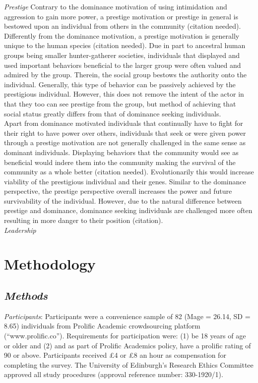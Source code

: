 \documentclass[
  english,
  a4paper]{apa7}
\begin{document}
\emph{Prestige}
Contrary to the dominance motivation of using intimidation and aggression to gain more power, a prestige motivation or prestige in general is bestowed upon an individual from others in the community (citation needed). Differently from the dominance motivation, a prestige motivation is generally unique to the human species (citation needed). Due in part to ancestral human groups being smaller hunter-gatherer societies, individuals that displayed and used important behaviors beneficial to the larger group were often valued and admired by the group. Therein, the social group bestows the authority onto the individual. Generally, this type of behavior can be passively achieved by the prestigious individual. However, this does not remove the intent of the actor in that they too can see prestige from the group, but method of achieving that social status greatly differs from that of dominance seeking individuals.\\
Apart from dominance motivated individuals that continually have to fight for their right to have power over others, individuals that seek or were given power through a prestige motivation are not generally challenged in the same sense as dominant individuals. Displaying behaviors that the community would see as beneficial would indere them into the community making the survival of the community as a whole better (citation needed). Evolutionarily this would increase viability of the prestigious individual and their genes. Similar to the dominance perspective, the prestige perspective overall increases the power and future survivability of the individual. However, due to the natural difference between prestige and dominance, dominance seeking individuals are challenged more often resulting in more danger to their position (citation).\\

\emph{Leadership}

\hypertarget{methodology}{%
\section{Methodology}\label{methodology}}

\hypertarget{methods}{%
\subsection{\texorpdfstring{\emph{Methods}}{Methods}}\label{methods}}

\emph{Participants}: Participants were a convenience sample of 82 (Mage = 26.14, SD = 8.65) individuals from Prolific Academic crowdsourcing platform (``www.prolific.co''). Requirements for participation were: (1) be 18 years of age or older and (2) and as part of Prolific Academics policy, have a prolific rating of 90 or above. Participants received £4 or £8 an hour as compensation for completing the survey. The University of Edinburgh's Research Ethics Committee approved all study procedures (approval reference number: 330-1920/1).
\end{document}
